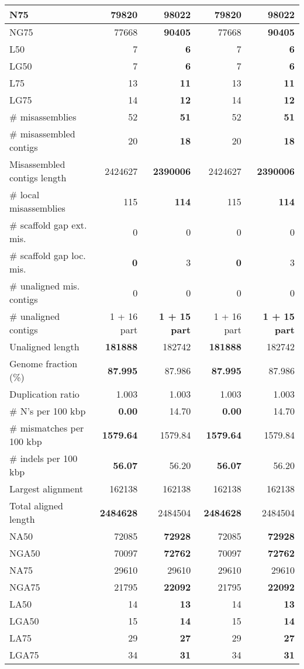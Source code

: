 \documentclass[12pt,a4paper]{article}
\begin{document}
\begin{table}[ht]
\begin{center}
\begin{tabular}{|l*{4}{|r}|}
N75 & 79820 & {\bf 98022} & 79820 & {\bf 98022} \\ \hline
NG75 & 77668 & {\bf 90405} & 77668 & {\bf 90405} \\ \hline
L50 & 7 & {\bf 6} & 7 & {\bf 6} \\ \hline
LG50 & 7 & {\bf 6} & 7 & {\bf 6} \\ \hline
L75 & 13 & {\bf 11} & 13 & {\bf 11} \\ \hline
LG75 & 14 & {\bf 12} & 14 & {\bf 12} \\ \hline
\# misassemblies & 52 & {\bf 51} & 52 & {\bf 51} \\ \hline
\# misassembled contigs & 20 & {\bf 18} & 20 & {\bf 18} \\ \hline
Misassembled contigs length & 2424627 & {\bf 2390006} & 2424627 & {\bf 2390006} \\ \hline
\# local misassemblies & 115 & {\bf 114} & 115 & {\bf 114} \\ \hline
\# scaffold gap ext. mis. & 0 & 0 & 0 & 0 \\ \hline
\# scaffold gap loc. mis. & {\bf 0} & 3 & {\bf 0} & 3 \\ \hline
\# unaligned mis. contigs & 0 & 0 & 0 & 0 \\ \hline
\# unaligned contigs & 1 + 16 part & {\bf 1 + 15 part} & 1 + 16 part & {\bf 1 + 15 part} \\ \hline
Unaligned length & {\bf 181888} & 182742 & {\bf 181888} & 182742 \\ \hline
Genome fraction (\%) & {\bf 87.995} & 87.986 & {\bf 87.995} & 87.986 \\ \hline
Duplication ratio & 1.003 & 1.003 & 1.003 & 1.003 \\ \hline
\# N's per 100 kbp & {\bf 0.00} & 14.70 & {\bf 0.00} & 14.70 \\ \hline
\# mismatches per 100 kbp & {\bf 1579.64} & 1579.84 & {\bf 1579.64} & 1579.84 \\ \hline
\# indels per 100 kbp & {\bf 56.07} & 56.20 & {\bf 56.07} & 56.20 \\ \hline
Largest alignment & 162138 & 162138 & 162138 & 162138 \\ \hline
Total aligned length & {\bf 2484628} & 2484504 & {\bf 2484628} & 2484504 \\ \hline
NA50 & 72085 & {\bf 72928} & 72085 & {\bf 72928} \\ \hline
NGA50 & 70097 & {\bf 72762} & 70097 & {\bf 72762} \\ \hline
NA75 & 29610 & 29610 & 29610 & 29610 \\ \hline
NGA75 & 21795 & {\bf 22092} & 21795 & {\bf 22092} \\ \hline
LA50 & 14 & {\bf 13} & 14 & {\bf 13} \\ \hline
LGA50 & 15 & {\bf 14} & 15 & {\bf 14} \\ \hline
LA75 & 29 & {\bf 27} & 29 & {\bf 27} \\ \hline
LGA75 & 34 & {\bf 31} & 34 & {\bf 31} \\ \hline
\end{tabular}
\end{center}
\end{table}
\end{document}
